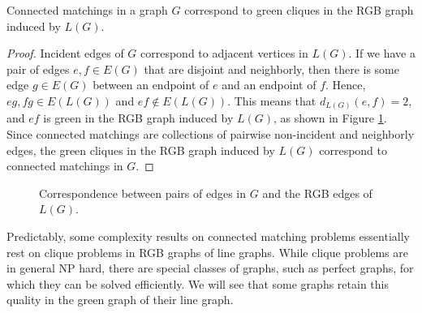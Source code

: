 \begin{prop}
Connected matchings in a graph $G$ correspond to green cliques in the RGB graph induced by $L(G)$.  
\end{prop} 

\begin{proof}
	Incident edges of $G$ correspond to adjacent vertices in $L(G)$.  If we have a pair of edges $e, f \in E(G)$ that are disjoint and neighborly, then there is some edge $g \in E(G)$ between an endpoint of $e$ and an endpoint of $f$.  Hence, $eg, fg \in E(L(G))$ and $ef \notin E(L(G))$.  This means that $d_{L(G)}(e,f) = 2$, and $ef$ is green in the RGB graph induced by $L(G)$, as shown in Figure \ref{coresp}.  Since connected matchings are collections of pairwise non-incident and neighborly edges, the green cliques in the RGB graph induced by $L(G)$ correspond to connected matchings in $G$.  
\end{proof}
\begin{figure}
\begin{center}
\hspace{1cm}
\hspace{1cm}

\label{coresp}
\caption{Correspondence between pairs of edges in $G$ and the RGB edges of $L(G)$.}
\end{center}
\end{figure}
Predictably, some complexity results on connected matching problems essentially rest on clique problems in RGB graphs of line graphs.  While clique problems are in general NP hard, there are special classes of graphs, such as perfect graphs, for which they can be solved efficiently.  We will see that some graphs retain this quality in the green graph of their line graph.
 

